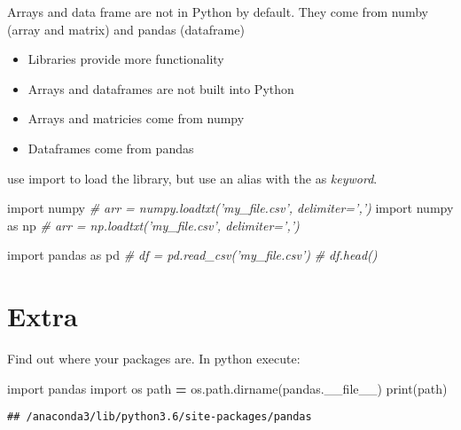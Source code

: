 \documentclass[]{book}
\newenvironment{Shaded}{\begin{snugshade}}{\end{snugshade}}
\newcommand{\BuiltInTok}[1]{#1}
\newcommand{\CommentTok}[1]{\textcolor[rgb]{0.56,0.35,0.01}{\textit{#1}}}
\newcommand{\ImportTok}[1]{#1}
\newcommand{\NormalTok}[1]{#1}
\newcommand{\OperatorTok}[1]{\textcolor[rgb]{0.81,0.36,0.00}{\textbf{#1}}}
\newcommand{\VariableTok}[1]{\textcolor[rgb]{0.00,0.00,0.00}{#1}}
\providecommand{\tightlist}{%
  \setlength{\itemsep}{0pt}\setlength{\parskip}{0pt}}
\theoremstyle{definition}
\theoremstyle{definition}
\theoremstyle{definition}
\theoremstyle{remark}
\begin{document}
Arrays and data frame are not in Python by default. They come from numby
(array and matrix) and pandas (dataframe)

\begin{itemize}
\tightlist
\item
  Libraries provide more functionality
\item
  Arrays and dataframes are not built into Python
\item
  Arrays and matricies come from numpy
\item
  Dataframes come from pandas
\end{itemize}

use import to load the library, but use an alias with the as
\emph{keyword}.

\begin{Shaded}
\begin{Highlighting}[]
\ImportTok{import}\NormalTok{ numpy}
\CommentTok{# arr = numpy.loadtxt('my_file.csv', delimiter=',')}
\ImportTok{import}\NormalTok{ numpy }\ImportTok{as}\NormalTok{ np}
\CommentTok{# arr = np.loadtxt('my_file.csv', delimiter=',')}
\end{Highlighting}
\end{Shaded}

\begin{Shaded}
\begin{Highlighting}[]
\ImportTok{import}\NormalTok{ pandas }\ImportTok{as}\NormalTok{ pd}
\CommentTok{# df = pd.read_csv('my_file.csv')}
\CommentTok{# df.head()}
\end{Highlighting}
\end{Shaded}

\hypertarget{extra}{%
\section{Extra}\label{extra}}

Find out where your packages are. In python execute:

\begin{Shaded}
\begin{Highlighting}[]
\ImportTok{import}\NormalTok{ pandas}
\ImportTok{import}\NormalTok{ os}
\NormalTok{path }\OperatorTok{=}\NormalTok{ os.path.dirname(pandas.}\VariableTok{__file__}\NormalTok{)}
\BuiltInTok{print}\NormalTok{(path)}
\end{Highlighting}
\end{Shaded}

\begin{verbatim}
## /anaconda3/lib/python3.6/site-packages/pandas
\end{verbatim}
\end{document}
